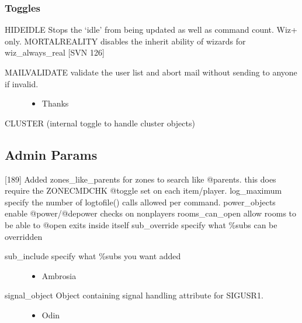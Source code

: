 \documentclass[letterpaper,10pt,english]{sphinxmanual}
\begin{document}
\subsubsection{Toggles}
\label{\detokenize{changelog:toggles}}
\sphinxAtStartPar
HIDEIDLE \sphinxhyphen{} Stops the ‘idle’ from being updated as well as command count.  Wiz+ only.
MORTALREALITY \sphinxhyphen{} disables the inherit ability of wizards for wiz\_always\_real {[}SVN 126{]}
\begin{description}
\item[{MAILVALIDATE \sphinxhyphen{} validate the user list and abort mail without sending to anyone if invalid.}] \leavevmode\begin{itemize}
\item {} 
\sphinxAtStartPar
Thanks 

\end{itemize}

\end{description}

\sphinxAtStartPar
CLUSTER \sphinxhyphen{} (internal toggle to handle cluster objects)


\subsection{Admin Params}
\label{\detokenize{changelog:admin-params}}
\sphinxAtStartPar
{[}18\sphinxhyphen{}9{]} Added zones\_like\_parents for zones to search like @parents.  \sphinxhyphen{} this does require the ZONECMDCHK @toggle set on each item/player.
log\_maximum \sphinxhyphen{} specify the number of logtofile() calls allowed per command.
power\_objects \sphinxhyphen{} enable @power/@depower checks on non\sphinxhyphen{}players
rooms\_can\_open \sphinxhyphen{} allow rooms to be able to @open exits inside itself
sub\_override \sphinxhyphen{} specify what \%\sphinxhyphen{}subs can be overridden
\begin{description}
\item[{sub\_include \sphinxhyphen{} specify what \%\sphinxhyphen{}subs you want added}] \leavevmode\begin{itemize}
\item {} 
\sphinxAtStartPar
Ambrosia

\end{itemize}

\item[{signal\_object \sphinxhyphen{} Object containing signal handling attribute for SIGUSR1.}] \leavevmode\begin{itemize}
\item {} 
\sphinxAtStartPar
Odin

\end{itemize}

\end{description}
\end{document}
